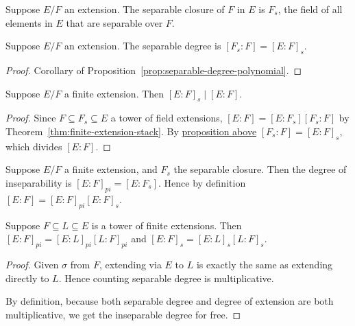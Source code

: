 \begin{definition}
    Suppose \(E/F\) an extension.
    The separable closure of \(F\) in \(E\) is \(F_s\),
    the field of all elements in \(E\) that are separable over \(F\).
\end{definition}
\begin{proposition}\label{prop:separable-degree}
    Suppose \(E/F\) an extension.
    The separable degree is \([F_s:F] = {[E:F]}_s\).
\end{proposition}
\begin{proof}
    Corollary of Proposition~\ref{prop:separable-degree-polynomial}.
\end{proof}
\begin{corollary}
    Suppose \(E/F\) a finite extension.
    Then \({[E:F]}_s \mid [E:F]\).
\end{corollary}
\begin{proof}
    Since \(F \subseteq F_s \subseteq E\) a tower of field extensions,
    \([E:F] = [E:F_s][F_s:F]\) by Theorem~\ref{thm:finite-extension-stack}.
    By \hyperref[prop:separable-degree]{proposition above}
    \([F_s:F] = {[E:F]}_s\), which divides \([E:F]\).
\end{proof}

\begin{definition}
    Suppose \(E/F\) a finite extension,
    and \(F_s\) the separable closure.
    Then the degree of inseparability is \({[E:F]}_{pi} = [E:F_s]\).
    Hence by definition \([E:F] = {[E:F]}_{pi}{[E:F]}_s\).
\end{definition}
\begin{proposition}
    Suppose \(F \subseteq L \subseteq E\) is a tower of finite extensions.
    Then \({[E:F]}_{pi} = {[E:L]}_{pi}{[L:F]}_{pi}\)
    and \({[E:F]}_s = {[E:L]}_s{[L:F]}_s\).
\end{proposition}
\begin{proof}
    Given \(\sigma\) from \(F\),
    extending via \(E\) to \(L\) is exactly the same as extending directly to \(L\).
    Hence counting separable degree is multiplicative.

    By definition, because both separable degree and degree of extension are both multiplicative,
    we get the inseparable degree for free.
\end{proof}

